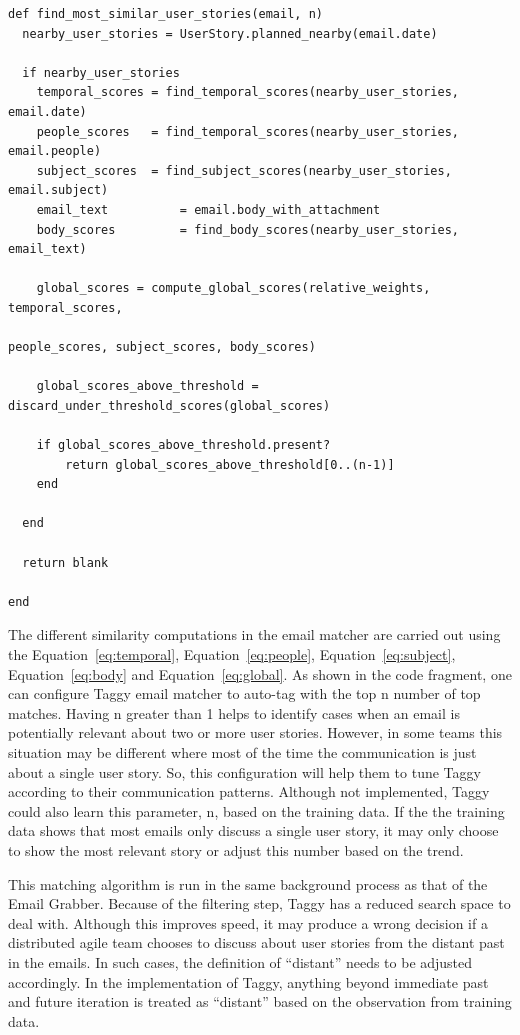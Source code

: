\pagebreak              
\begin{verbatim}
def	find_most_similar_user_stories(email, n)
  nearby_user_stories = UserStory.planned_nearby(email.date)

  if nearby_user_stories
    temporal_scores = find_temporal_scores(nearby_user_stories, email.date)
    people_scores 	= find_temporal_scores(nearby_user_stories, email.people)
    subject_scores 	= find_subject_scores(nearby_user_stories, email.subject)
    email_text 			= email.body_with_attachment
    body_scores 		= find_body_scores(nearby_user_stories, email_text)

    global_scores = compute_global_scores(relative_weights, temporal_scores, 
																people_scores, subject_scores, body_scores)

    global_scores_above_threshold =  discard_under_threshold_scores(global_scores)

    if global_scores_above_threshold.present?
    	return global_scores_above_threshold[0..(n-1)]
    end
		
  end
	
  return blank
	
end
\end{verbatim}

The different similarity computations in the email matcher are carried out using the Equation~\ref{eq:temporal}, Equation~\ref{eq:people}, Equation~\ref{eq:subject}, Equation~\ref{eq:body} and Equation~\ref{eq:global}. As shown in the code fragment, one can configure Taggy email matcher to auto-tag with the top n number of top matches. Having n greater than 1 helps to identify cases when an email is potentially relevant about two or more user stories. However, in some teams this situation may be different where most of the time the communication is just about a single user story. So, this configuration will help them to tune Taggy according to their communication patterns. Although not implemented, Taggy could also learn this parameter, n, based on the training data. If the the training data shows that most emails only discuss a single user story, it may only choose to show the most relevant story or adjust this number based on the trend.

This matching algorithm is run in the same background process as that of the Email Grabber. Because of the filtering step, Taggy has a reduced search space to deal with. Although this improves speed, it may produce a wrong decision if a distributed agile team chooses to discuss about user stories from the distant past in the emails. In such cases, the definition of ``distant'' needs to be adjusted accordingly. In the implementation of Taggy, anything beyond immediate past and future iteration is treated as ``distant'' based on the observation from training data.

